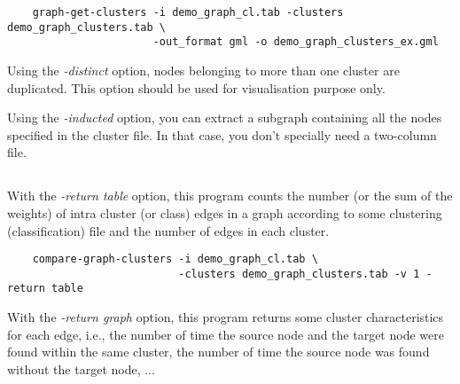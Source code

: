 {\begin{footnotesize}\begin{verbatim}
    graph-get-clusters -i demo_graph_cl.tab -clusters demo_graph_clusters.tab \
                       -out_format gml -o demo_graph_clusters_ex.gml
\end{verbatim} \end{footnotesize}
}

Using the \textit{-distinct} option, nodes belonging to more than one cluster are duplicated. This option should be used for visualisation purpose only.

Using the \textit{-inducted} option, you can extract a subgraph containing all the nodes specified in the cluster file. In that case, you don't specially need a
two-column file.

\subsection{}

With the \textit{-return table} option, this program counts the number (or the sum of the weights) of intra cluster (or class) edges in a graph according to some clustering (classification) file and the number of edges in each cluster.

{\begin{footnotesize}\begin{verbatim}
    compare-graph-clusters -i demo_graph_cl.tab \
                           -clusters demo_graph_clusters.tab -v 1 -return table
\end{verbatim} \end{footnotesize}
}

With the \textit{-return graph} option, this program returns some cluster characteristics for each edge, i.e., the number of time the source node and the target node were found within the same cluster, the number of time the source node was found without the target node, ...

